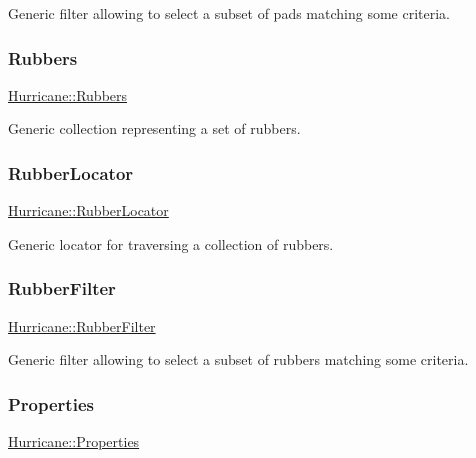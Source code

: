 Generic filter allowing to select a subset of pads matching some criteria. \mbox{\label{namespaceHurricane_af8923abd57508cc44931a00d61b564ad}} 
\subsubsection{\texorpdfstring{Rubbers}{Rubbers}}
{\footnotesize\ttfamily \hyperlink{namespaceHurricane_af8923abd57508cc44931a00d61b564ad}{Hurricane\+::\+Rubbers}}

Generic collection representing a set of rubbers. \mbox{\label{namespaceHurricane_ae4f27278e942109c3c47ad1b741f9df3}} 
\subsubsection{\texorpdfstring{Rubber\+Locator}{RubberLocator}}
{\footnotesize\ttfamily \hyperlink{namespaceHurricane_ae4f27278e942109c3c47ad1b741f9df3}{Hurricane\+::\+Rubber\+Locator}}

Generic locator for traversing a collection of rubbers. \mbox{\label{namespaceHurricane_ae331d428a7e324593e4a47dac023b7f0}} 
\subsubsection{\texorpdfstring{Rubber\+Filter}{RubberFilter}}
{\footnotesize\ttfamily \hyperlink{namespaceHurricane_ae331d428a7e324593e4a47dac023b7f0}{Hurricane\+::\+Rubber\+Filter}}

Generic filter allowing to select a subset of rubbers matching some criteria. \mbox{\label{namespaceHurricane_afd7bca6dad4be54b7c03b0463e6c0004}} 
\subsubsection{\texorpdfstring{Properties}{Properties}}
{\footnotesize\ttfamily \hyperlink{namespaceHurricane_afd7bca6dad4be54b7c03b0463e6c0004}{Hurricane\+::\+Properties}}

